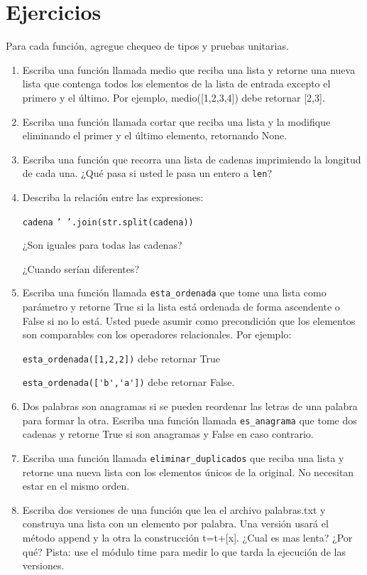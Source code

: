 \section{Ejercicios}

Para cada función, agregue chequeo de tipos y pruebas unitarias.
\begin{enumerate}
\item Escriba una función llamada medio que reciba una lista y retorne una
nueva lista que contenga todos los elementos de la lista de entrada
excepto el primero y el último. Por ejemplo, medio({[}1,2,3,4{]})
debe retornar {[}2,3{]}.
\item Escriba una función llamada cortar que reciba una lista y la modifique
eliminando el primer y el último elemento, retornando None.
\item Escriba una función que recorra una lista de cadenas imprimiendo la
longitud de cada una. ¿Qué pasa si usted le pasa un entero a \texttt{len}?
\item Describa la relación entre las expresiones:

\texttt{cadena} \hfill{}\texttt{' '.join(str.split(cadena))}

¿Son iguales para todas las cadenas?

¿Cuando serían diferentes?
\item Escriba una función llamada \verb+esta_ordenada+ que tome una lista
como parámetro y retorne True si la lista está ordenada de forma ascendente
o False si no lo está. Usted puede asumir como precondición que los
elementos son comparables con los operadores relacionales. Por ejemplo:

\verb+esta_ordenada([1,2,2])+ debe retornar True

\verb+esta_ordenada(['b','a'])+ debe retornar False.
\item Dos palabras son anagramas si se pueden reordenar las letras de una
palabra para formar la otra. Escriba una función llamada \verb+es_anagrama+
que tome dos cadenas y retorne True si son anagramas y False en caso
contrario.
\item Escriba una función llamada \verb+eliminar_duplicados+ que reciba
una lista y retorne una nueva lista con los elementos únicos de la
original. No necesitan estar en el mismo orden.
\item Escriba dos versiones de una función que lea el archivo palabras.txt
y construya una lista con un elemento por palabra. Una versión usará
el método append y la otra la construcción t=t+{[}x{]}. ¿Cual es mas
lenta? ¿Por qué? Pista: use el módulo time para medir lo que tarda
la ejecución de las versiones.


\end{enumerate}
